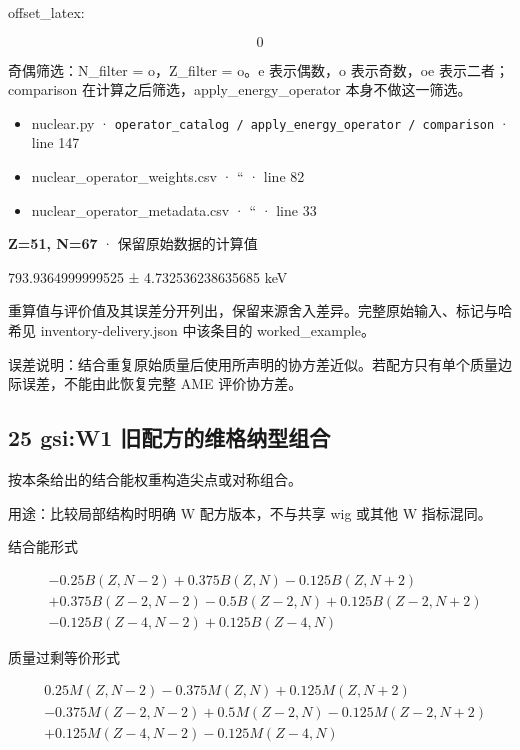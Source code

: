 \documentclass[
  11pt,
  letterpaper,
]{article}
\providecommand{\tightlist}{%
  \setlength{\itemsep}{0pt}\setlength{\parskip}{0pt}}
\begin{document}
offset\_latex:

\[
0
\]

奇偶筛选：N\_filter = o，Z\_filter = o。e 表示偶数，o 表示奇数，oe
表示二者；comparison 在计算之后筛选，apply\_energy\_operator
本身不做这一筛选。

\begin{itemize}
\tightlist
\item
  nuclear.py ·
  \texttt{operator\_catalog\ /\ apply\_energy\_operator\ /\ comparison}
  · line 147
\item
  nuclear\_operator\_weights.csv · `` · line 82
\item
  nuclear\_operator\_metadata.csv · `` · line 33
\end{itemize}

\textbf{Z=51, N=67} · 保留原始数据的计算值

793.9364999999525 ± 4.732536238635685 keV

重算值与评价值及其误差分开列出，保留来源舍入差异。完整原始输入、标记与哈希见
inventory-delivery.json 中该条目的 worked\_example。

误差说明：结合重复原始质量后使用所声明的协方差近似。若配方只有单个质量边际误差，不能由此恢复完整
AME 评价协方差。

\subsection{25 gsi:W1
旧配方的维格纳型组合}\label{gsiw1-ux65e7ux914dux65b9ux7684ux7ef4ux683cux7eb3ux578bux7ec4ux5408}

按本条给出的结合能权重构造尖点或对称组合。

用途：比较局部结构时明确 W 配方版本，不与共享 wig 或其他 W 指标混同。

结合能形式

\[
\begin{aligned}
& -0.25B(Z,N-2)+0.375B(Z,N)-0.125B(Z,N+2) \\
& +0.375B(Z-2,N-2)-0.5B(Z-2,N)+0.125B(Z-2,N+2) \\
& -0.125B(Z-4,N-2)+0.125B(Z-4,N)
\end{aligned}
\]

质量过剩等价形式

\[
\begin{aligned}
& 0.25M(Z,N-2)-0.375M(Z,N)+0.125M(Z,N+2) \\
& -0.375M(Z-2,N-2)+0.5M(Z-2,N)-0.125M(Z-2,N+2) \\
& +0.125M(Z-4,N-2)-0.125M(Z-4,N)
\end{aligned}
\]
\end{document}
